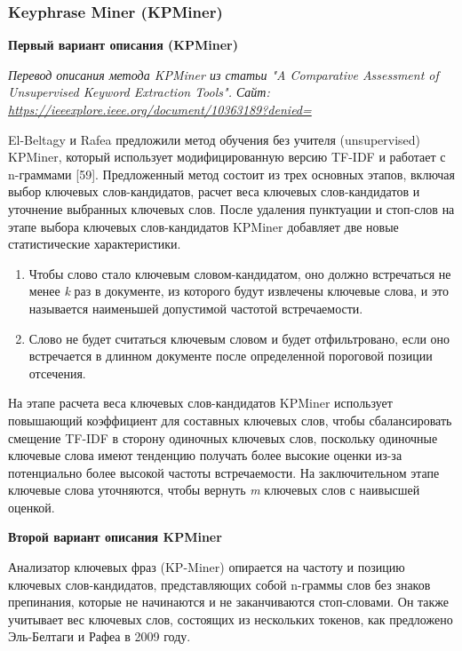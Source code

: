 \documentclass[bachelor, och, diploma ]{SCWorks}
\begin{document}
\subsubsection{Keyphrase Miner (KPMiner)}
\textbf{Первый вариант описания (KPMiner)}

\textit{Перевод описания метода KPMiner из статьи "A Comparative Assessment of Unsupervised Keyword Extraction Tools". Сайт: \url{https://ieeexplore.ieee.org/document/10363189?denied=}}

El-Beltagy и Rafea предложили метод обучения без учителя (unsupervised) KPMiner, который использует модифицированную версию TF-IDF и работает с n-граммами [59]. Предложенный метод состоит из трех основных этапов, включая выбор ключевых слов-кандидатов, расчет веса ключевых слов-кандидатов и уточнение выбранных ключевых слов. После удаления пунктуации и стоп-слов на этапе выбора ключевых слов-кандидатов KPMiner добавляет две новые статистические характеристики. 
\begin{enumerate}
    \item Чтобы слово стало ключевым словом-кандидатом, оно должно встречаться не менее \textit{k} раз в документе, из которого будут извлечены ключевые слова, и это называется наименьшей допустимой частотой встречаемости.
    \item Слово не будет считаться ключевым словом и будет отфильтровано, если оно встречается в длинном документе после определенной пороговой позиции отсечения.
\end{enumerate}

На этапе расчета веса ключевых слов-кандидатов KPMiner использует повышающий коэффициент для составных ключевых слов, чтобы сбалансировать смещение TF-IDF в сторону одиночных ключевых слов, поскольку одиночные ключевые слова имеют тенденцию получать более высокие оценки из-за потенциально более высокой частоты встречаемости. На заключительном этапе ключевые слова уточняются, чтобы вернуть \textit{m} ключевых слов с наивысшей оценкой.



\textbf{Второй вариант описания KPMiner}

Анализатор ключевых фраз (KP-Miner) опирается на частоту и позицию ключевых слов-кандидатов, представляющих собой n-граммы слов без знаков препинания, которые не начинаются и не заканчиваются стоп-словами. Он также учитывает вес ключевых слов, состоящих из нескольких токенов, как предложено Эль-Белтаги и Рафеа в 2009 году.
\end{document}
